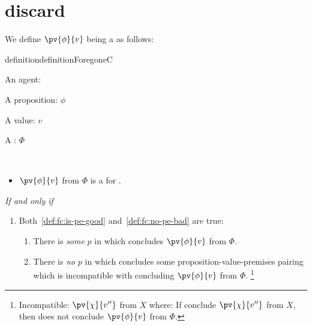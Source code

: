 \chapter{ discard}
\label{cha:fc3-discard}

\begin{note}[\fc{2} definition]
  We define \(\pv{\phi}{v}\) being a \emph{} as follows:

  \begin{restatable}[\fc{3}]{definition}{definitionForegoneC}
    \label{def:fc}
    \begin{itemize*}[noitemsep, label=\(\circ\)]
    \item
      An agent: \vAgent{}
    \item
      A proposition: \(\phi\)
    \item
      A value: \(v\)
    \item
      A : \(\Phi\)
    \item
      \mbox{ }
    \end{itemize*}

    \begin{itemize}
    \item
      \(\pv{\phi}{v}\) from \(\Phi\) is a \emph{} for \vAgent{}.
    \end{itemize}
    \emph{If and only if}
    \begin{enumerate}[label=]
    \item
      Both~\ref{def:fc:is-pe-good} and~\ref{def:fc:no-pe-bad} are true:
      \begin{enumerate}[label=\alph*., ref=(\alph*)]
      \item
        \label{def:fc:is-pe-good}
        There is \emph{some} \pevent{} \(p\) in which \vAgent{} concludes \(\pv{\phi}{v}\) from \(\Phi\).
      \item
        \label{def:fc:no-pe-bad}
        There is \emph{no} \pevent{} \(p\) in which \vAgent{} concludes some proposition-value-premises pairing which is incompatible with concluding \(\pv{\phi}{v}\) from \(\Phi\).%
        \footnote{
          Incompatible:
          \(\pv{\chi}{v''}\) from \(X\) where:
        If conclude \(\pv{\chi}{v''}\) from \(X\), then does not conclude \(\pv{\phi}{v}\) from \(\Phi\).
        }
      \end{enumerate}
    \end{enumerate}
    \vspace{-\baselineskip}
  \end{restatable}
\end{note}

